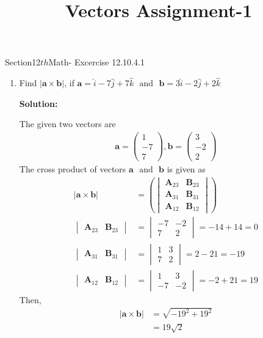 \documentclass[12pt]{article}
\newcommand{\mydet}[1]{\ensuremath{\begin{vmatrix}#1\end{vmatrix}}}
\providecommand{\abs}[1]{\left\vert#1\right\vert}
\providecommand{\brak}[1]{\ensuremath{\left(#1\right)}}
\newcommand{\solution}{\noindent \textbf{Solution: }}
\newcommand{\myvec}[1]{\ensuremath{\begin{pmatrix}#1\end{pmatrix}}}
\let\vec\mathbf
\begin{document}
\begin{center}\title{\textbf{Vectors Assignment-1}}
	\date{\vspace{-5ex}}
\maketitle
\end{center}
\setcounter{page}{1}
Section{12${th}$Math- Excercise 12.10.4.1}

\begin{enumerate}
	\item Find $\abs{\vec{a}\times\vec{b}}$, if $\vec{a}=\hat{i}-7\hat{j}+7\hat{k}$ $\text{ and } $ $\vec{b}=3\hat{i}-2\hat{j}+2\hat{k}$

\solution

The given two vectors are
	\begin{align}
		\vec{a}=\myvec{1 \\ -7 \\ 7}, \vec{b}=\myvec{3 \\ -2 \\ 2}
	\end{align}
The cross product of vectors $\vec{a}$ $\text{ and }$ $\vec{b}$ is given as
\begin{align}
	\abs{\vec{a}\times\vec{b}}&=\brak{\mydet{\vec{A}_{23}& \vec{B}_{23} \\ \vec{A}_{31} & \vec{B}_{31} \\ \vec{A}_{12}& \vec{B}_{12}}}\\
	\mydet{\vec{A}_{23}&\vec{B}_{23}}&=\mydet{-7 & -2 \\ 7 & 2}=-14+14=0\\
	\mydet{\vec{A}_{31}&\vec{B}_{31}}&=\mydet{1 & 3 \\ 7 & 2}=2-21=-19\\
	\mydet{\vec{A}_{12}&\vec{B}_{12}}&=\mydet{1 & 3 \\ -7 & -2}=-2+21=19
\end{align}
Then,
\begin{align}
	\abs{\vec{a}\times\vec{b}}&=\sqrt{-19^2+19^2}\\
&=19\sqrt{2}
\end{align}
\end{enumerate}
\end{document}
